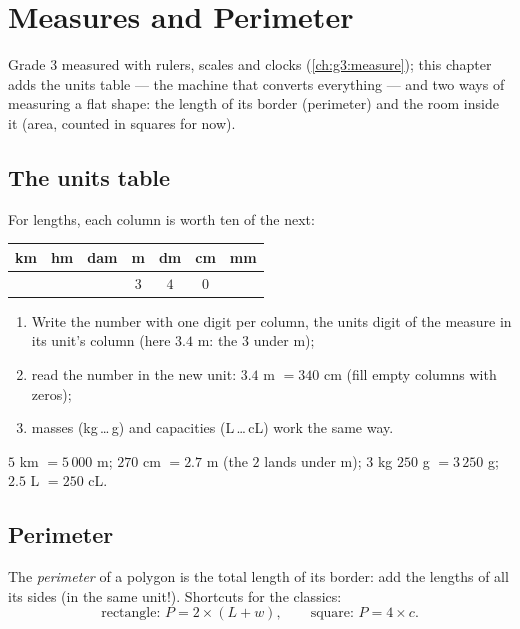 \chapter{Measures and Perimeter}\label{ch:g4:measure}

Grade 3 measured with rulers, scales and clocks
(\cref{ch:g3:measure}); this chapter adds the units table --- the
machine that converts everything --- and two ways of measuring a flat
shape: the length of its border (perimeter) and the room inside it
(area, counted in squares for now).

\section{The units table}

\begin{method}\label{met:g4:measure:table}
For lengths, each column is worth ten of the next:
\begin{center}
\renewcommand{\arraystretch}{1.3}
\begin{tabular}{c|c|c|c|c|c|c}
km & hm & dam & m & dm & cm & mm \\
\hline
 & & & $3$ & $4$ & $0$ & \\
\end{tabular}
\end{center}
\begin{enumerate}
  \item Write the number with one digit per column, the units digit
        of the measure in its unit's column (here $3.4$ m: the $3$
        under m);
  \item read the number in the new unit: $3.4$ m $= 340$ cm (fill
        empty columns with zeros);
  \item masses (kg\,\dots\,g) and capacities (L\,\dots\,cL) work the
        same way.
\end{enumerate}
\end{method}

\begin{example}\label{ex:g4:measure:convert}
$5$ km $= 5\,000$ m; \quad $270$ cm $= 2.7$ m (the $2$ lands under
m); \quad $3$ kg $250$ g $= 3\,250$ g; \quad
$2.5$ L $= 250$ cL.
\end{example}

\section{Perimeter}

\begin{definition}[Perimeter]\label{def:g4:measure:perimeter}
The \emph{perimeter} of a polygon is the total
length of its border: add the lengths of all its sides (in the same
unit!). Shortcuts for the classics:
\[
\text{rectangle: } P = 2 \times (L + w),
\qquad
\text{square: } P = 4 \times c .
\]
\end{definition}


